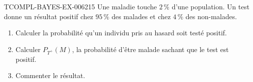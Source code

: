 \begin{exercice}{TCOMPL-BAYES-EX-006}{2}{15}
Une maladie touche $2\,\%$ d'une population. Un test donne un résultat positif
chez $95\,\%$ des malades et chez $4\,\%$ des non-malades.
\begin{enumerate}
  \item Calculer la probabilité qu'un individu pris au hasard soit testé
        positif.
  \item Calculer $P_{T^+}(M)$, la probabilité d'être malade sachant que le
        test est positif.
  \item Commenter le résultat.
\end{enumerate}
\end{exercice}
